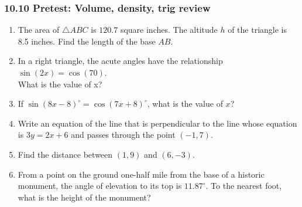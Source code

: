 \documentclass[12pt, twoside]{article}
\begin{document}
\subsubsection*{10.10 Pretest: Volume, density, trig review}
 \begin{enumerate}

   \item The area of $\triangle ABC$ is $120.7$ square inches. The altitude $h$ of the triangle is 8.5 inches. Find the length of the base $AB$.\\[0.5cm]
    \vspace{0.5cm}

  \item In a right triangle, the acute angles have the relationship $\sin (2x)=\cos(70)$.\\[0.25cm]
    What is the value of x? \vspace{2.5cm}

  \item If $\sin (8x-8)^\circ = \cos(7x+8)^\circ$, what is the value of $x$? \vspace{3cm}

  \item Write an equation of the line that is perpendicular to the line whose equation is $3y=2x+6$ and passes through the point $(-1,7)$. \vspace{2cm}

  \item Find the distance between $(1,9)$ and $(6, -3)$.

\newpage
  \item From a point on the ground one-half mile from the base of a historic monument, the angle of elevation to its top is $11.87^\circ$. To the nearest foot, what is the height of the monument?\\[1cm]
    \vspace{3cm}


\end{enumerate}
\end{document}
